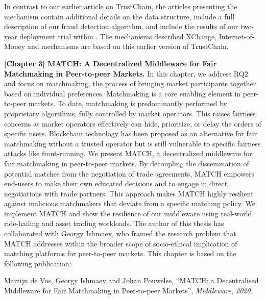 In contrast to our earlier article on TrustChain, the articles presenting the \TrustChain{} mechanism contain additional details on the data structure, include a full description of our fraud detection algorithm, and include the results of our two-year deployment trial within \Tribler{}.
The mechanisms described XChange, Internet-of-Money and \Dappcoder{} mechanisms are based on this earlier version of TrustChain.

\textbf{[Chapter 3] MATCH: A Decentralized Middleware for Fair Matchmaking in Peer-to-peer Markets.}
In this chapter, we address RQ2 and focus on matchmaking, the process of bringing market participants together based on individual preferences.
Matchmaking is a core enabling element in peer-to-peer markets.
To date, matchmaking is predominantly performed by proprietary algorithms, fully controlled by market operators.
This raises fairness concerns as market operators effectively can hide, prioritize, or delay the orders of specific users.
Blockchain technology has been proposed as an alternative for fair matchmaking without a trusted operator but is still vulnerable to specific fairness attacks like front-running.
We present MATCH, a decentralized middleware for fair matchmaking in peer-to-peer markets.
By decoupling the dissemination of potential matches from the negotiation of trade agreements, MATCH empowers end-users to make their own educated decisions and to engage in direct negotiations with trade partners.
This approach makes MATCH highly resilient against malicious matchmakers that deviate from a specific matching policy.
We implement MATCH and show the resilience of our middleware using real-world ride-hailing and asset trading workloads.
The author of this thesis has collaborated with Georgy Ishmaev, who framed the research problem that MATCH addresses within the broader scope of socio-ethical implication of matching platforms for peer-to-peer markets.
This chapter is based on the following publication:

Martijn de Vos, Georgy Ishmaev and Johan Pouwelse, \enquote{MATCH: a Decentralised Middleware for Fair Matchmaking in Peer-to-peer Markets}, \emph{Middleware, 2020.}\\

